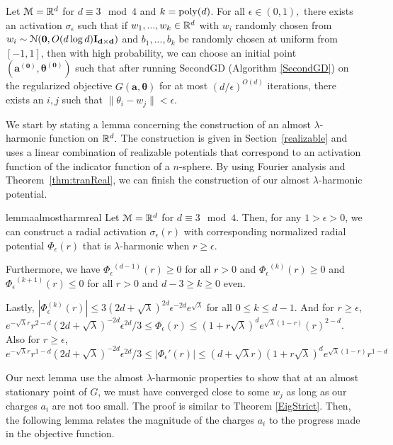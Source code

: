 %
%
\begin{theorem}\label{almostHarmSGD}
  Let $\mathcal{M} = {\mathbb{R}}^{d}$ for $d \equiv 3 \mod 4$ and $k = \mathrm{poly}(d)$. For all $\epsilon \in (0,1),$ there exists an activation $\sigma_\epsilon$ such that if $w_1,...,w_k \in {\mathbb{R}}^d$ with $w_i$ randomly chosen from $w_i \sim  \mathcal{N}({\bf 0}, O(d\log d){\bf I_{d\times d}})$ and $b_1,...,b_k$ be randomly chosen at uniform from $[-1,1]$, then with high probability, we can choose an initial point $(\boldsymbol{a^{(0)}, \theta^{(0)}})$ such that after running SecondGD (Algorithm \ref{SecondGD}) on the regularized objective $G(\boldsymbol{a,\theta})$ for at most $(d/\epsilon)^{O(d)}$ iterations, there exists an $i, j$ such that $\|\theta_i - w_j\| <  \epsilon$.
\end{theorem}
%
We start by stating a lemma concerning the construction of an almost
$\lambda$-harmonic function on ${\mathbb{R}}^d.$ The construction is given in
Section~\ref{realizable} and uses a linear combination of realizable potentials that correspond to an activation function of the indicator function of a $n$-sphere. By using Fourier analysis and Theorem~\ref{thm:tranReal}, we can finish the construction of our almost $\lambda$-harmonic potential.%
%
\begin{restatable}{lemma}{almostharmreal}\label{almostharmreal}
Let $\mathcal{M} = {\mathbb{R}}^d$ for $d \equiv 3 \mod 4$. Then, for any $1 > \epsilon > 0$, we can construct a radial activation $\sigma_\epsilon(r)$ with corresponding normalized radial potential $\Phi_\epsilon(r)$ that is $\lambda$-harmonic when $r \geq \epsilon$.

Furthermore, we have ${\Phi_\epsilon}^{(d-1)}(r) \geq 0$ for all $r  > 0$ and ${\Phi_\epsilon}^{(k)}(r) \geq 0$ and ${\Phi_\epsilon}^{(k+1)}(r)\leq 0$ for all $r > 0$ and $d - 3 \geq k \geq 0 $ even.

Lastly, $|{\Phi}_\epsilon^{(k)}(r)| \leq 3(2d + \sqrt{\lambda})^{2d} \epsilon^{-2d}e^{\sqrt{\lambda}}$ for all $0 \leq k \leq d-1$. And for $r \geq \epsilon$, $e^{-\sqrt{\lambda}r}r^{2-d}(2d+\sqrt{\lambda})^{-2d}\epsilon^{2d}/3\leq {\Phi}_\epsilon(r) \leq (1+r\sqrt{\lambda})^de^{\sqrt{\lambda}(1-r)}(r)^{2-d}$. Also for $r \geq \epsilon$, $ e^{-\sqrt{\lambda}r}r^{1-d}(2d+\sqrt{\lambda})^{-2d}\epsilon^{2d}/3 \leq |{\Phi}_\epsilon'(r)| \leq (d+\sqrt{\lambda}r)(1+ r\sqrt{\lambda})^de^{\sqrt{\lambda}(1- r)} r^{1-d}$
\end{restatable}
%
%
Our next lemma use the almost $\lambda$-harmonic properties to show that at an almost stationary point of $G$, we must have converged close to some $w_j$ as long as our charges $a_i$ are not too small. The proof is similar to Theorem \ref{EigStrict}. Then, the following lemma relates the magnitude of the charges $a_i$ to the progress made in the objective function. 
